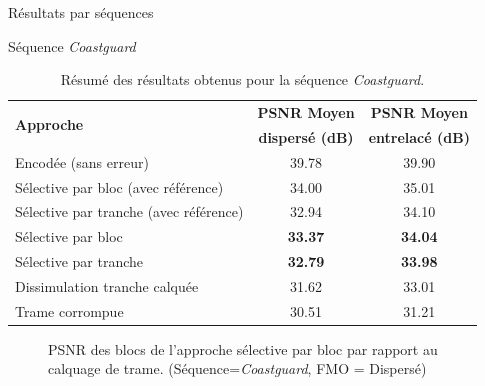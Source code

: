 \begin{section}{Résultats par séquences}
\begin{subsection}{Séquence \textit{Coastguard}}
\begin{table}
\caption[Résumé des résultats obtenus pour la séquence
\textit{Coastguard}]{Résumé des résultats obtenus pour la séquence
\textit{Coastguard}.}
\centering
\begin{tabular}{| l | c | c |}
 \hline
 \multirow{2}{*}{\textbf{Approche}} & \textbf{PSNR Moyen}& \textbf{PSNR Moyen}\\
 &\textbf{dispersé (dB)}&\textbf{entrelacé (dB)}\\
 \hline
Encodée (sans erreur) & 39.78 & 39.90\\
Sélective par bloc (avec référence) & 34.00 & 35.01\\
Sélective par tranche (avec référence) & 32.94 & 34.10\\
Sélective par bloc & \textbf{33.37} & \textbf{34.04}\\
Sélective par tranche & \textbf{32.79} & \textbf{33.98}\\
Dissimulation tranche calquée & 31.62 & 33.01\\
Trame corrompue & 30.51 & 31.21\\
\hline
\end{tabular}
\end{table}

\begin{figure}  \caption[]{PSNR des blocs de l'approche sélective par bloc par rapport au
calquage de trame. (Séquence=\textit{Coastguard}, FMO = Dispersé)}
\label{fig-ParSequenceDispersed6}
\end{figure}


\end{subsection}
\end{section}
